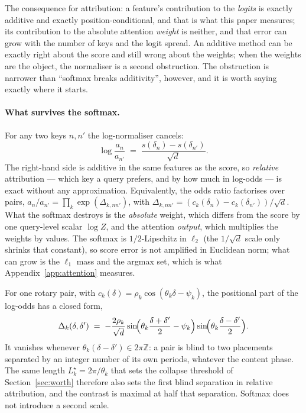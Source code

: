 \documentclass{article}
\theoremstyle{plain}
\theoremstyle{remark}
\begin{document}
The consequence for attribution: a feature's contribution to the \emph{logits}
is exactly additive and exactly position-conditional, and that is what this
paper measures; its contribution to the absolute attention \emph{weight} is
neither, and that error can grow with the number of keys and the logit spread.
An additive method can be exactly right about the score and still wrong about
the weights; when the weights are the object, the normaliser is a second
obstruction. The obstruction is narrower than ``softmax breaks additivity'',
however, and it is worth saying exactly where it starts.

\paragraph{What survives the softmax.}
For any two keys $n,n'$ the log-normaliser cancels:
\begin{equation}
  \log\frac{a_n}{a_{n'}}
  \;=\; \frac{s(\delta_n)-s(\delta_{n'})}{\sqrt d}.
  \label{eq:logodds}
\end{equation}
The right-hand side is additive in the same features as the score, so
\emph{relative} attribution --- which key a query prefers, and by how much in
log-odds --- is exact without any approximation. Equivalently, the odds ratio
factorises over pairs,
$a_n/a_{n'} = \prod_k \exp(\Delta_{k,nn'})$, with
$\Delta_{k,nn'} = (c_k(\delta_n)-c_k(\delta_{n'}))/\sqrt d$. What the softmax
destroys is the \emph{absolute} weight, which differs from the score by one
query-level scalar $\log Z$, and the attention \emph{output}, which multiplies
the weights by values. The softmax is $1/2$-Lipschitz in $\ell_2$ (the
$1/\sqrt d$ scale only shrinks that constant), so score error is not amplified
in Euclidean norm; what can grow is the $\ell_1$ mass and the argmax set, which
is what Appendix~\ref{app:attention} measures.

For one rotary pair, with $c_k(\delta)=\rho_k\cos(\theta_k\delta-\psi_k)$,
the positional part of the log-odds has a closed form,
\begin{equation}
  \Delta_k(\delta,\delta') \;=\; -\frac{2\rho_k}{\sqrt d}
  \sin\!\Bigl(\theta_k\frac{\delta+\delta'}{2}-\psi_k\Bigr)
  \sin\!\Bigl(\theta_k\frac{\delta-\delta'}{2}\Bigr).
  \label{eq:contrast}
\end{equation}
It vanishes whenever $\theta_k(\delta-\delta') \in 2\pi\mathbb{Z}$: a pair is
blind to two placements separated by an integer number of its own periods,
whatever the content phase. The same length $L_k^\star=2\pi/\theta_k$ that sets
the collapse threshold of Section~\ref{sec:worth} therefore also sets the first
blind separation in relative attribution, and the contrast is maximal at half
that separation. Softmax does not introduce a second scale.
\end{document}
